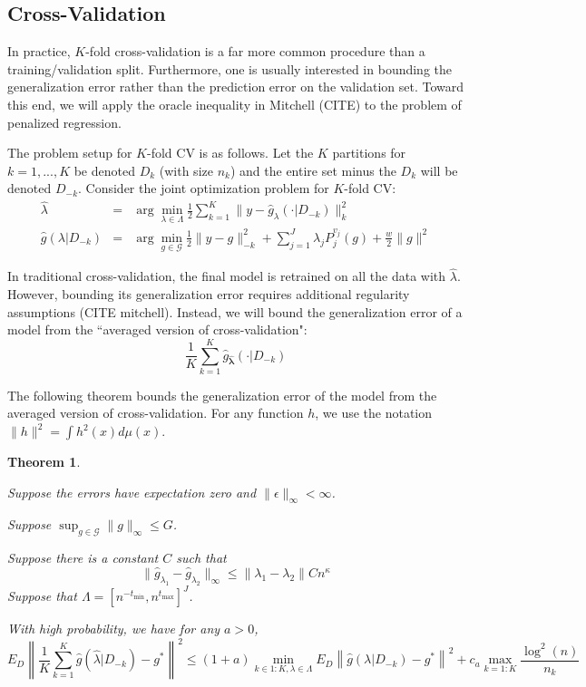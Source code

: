 \documentclass[12pt]{article}
\newtheorem{theorem}{Theorem}
\begin{document}
\subsection{Cross-Validation}

In practice, $K$-fold cross-validation is a far more common procedure than a training/validation split. Furthermore, one is usually interested in bounding the generalization error rather than the prediction error on the validation set. Toward this end, we will apply the oracle inequality in Mitchell (CITE) to the problem of penalized regression. 

The problem setup for $K$-fold CV is as follows. Let the $K$ partitions for $k=1,...,K$ be denoted $D_k$ (with size $n_k$) and the entire set minus the $D_k$ will be denoted $D_{-k}$. Consider the joint optimization problem for $K$-fold CV:
\begin{eqnarray}
\label{kfold_opt}
\hat{\lambda} &=& \arg\min_{\lambda\in\Lambda} \frac{1}{2} \sum_{k=1}^K  \| y-\hat{g}_{\lambda}(\cdot| D_{-k}) \|_{k}^{2} \\
\hat{g}(\lambda | D_{-k})&=&\arg\min_{g\in\mathcal{G}} \frac{1}{2} \| y-g \|_{-k}^{2} + \sum_{j=1}^J \lambda_j P_j^{v_j}(g) + \frac{w}{2} \|g\|^2
\end{eqnarray}

In traditional cross-validation, the final model is retrained on all the data with $\hat{\lambda}$. However, bounding its generalization error requires additional regularity assumptions (CITE mitchell). Instead, we will bound the generalization error of a model from the ``averaged version of cross-validation":
\begin{equation}
\frac{1}{K} \sum_{k=1}^K \hat{g}_{\hat{\boldsymbol \lambda}}(\cdot | D_{-k})
\end{equation}

The following theorem bounds the generalization error of the model from the averaged version of cross-validation. For any function $h$, we use the notation $\| h \|^2 = \int h^2(x) d\mu(x)$.

\begin{theorem}
\label{kfold_thrm}

Suppose the errors have expectation zero and $\| \epsilon \|_\infty < \infty $.

Suppose $\sup_{g \in \mathcal{G}} \|g\|_\infty \le G$.

Suppose there is a constant $C$ such that
\begin{equation}
\| \hat{g}_{\lambda_1} - \hat{g}_{\lambda_2} \|_\infty \le \| \lambda_1 - \lambda_2 \| C n^\kappa
\end{equation}
Suppose that $\Lambda = [ n^{-t_{\min}}, n^{t_{\max}} ]^J $.


With high probability, we have for any $a > 0$,
\begin{equation}
\label{smooth_error_bound}
E_{D} \left \| \frac{1}{K}\sum_{k=1}^K \hat{g}(\hat{\lambda} | D_{-k}) - g^* \right \|^2 \le
(1+a) \min_{k\in 1:K, \lambda \in \Lambda}  E_{D} \left \| \hat{g}(\lambda | D_{-k}) - g^* \right \|^2
+ c_a \max_{k=1:K} \frac{\log^2(n)}{n_k}
\end{equation}
\end{theorem}
\end{document}
